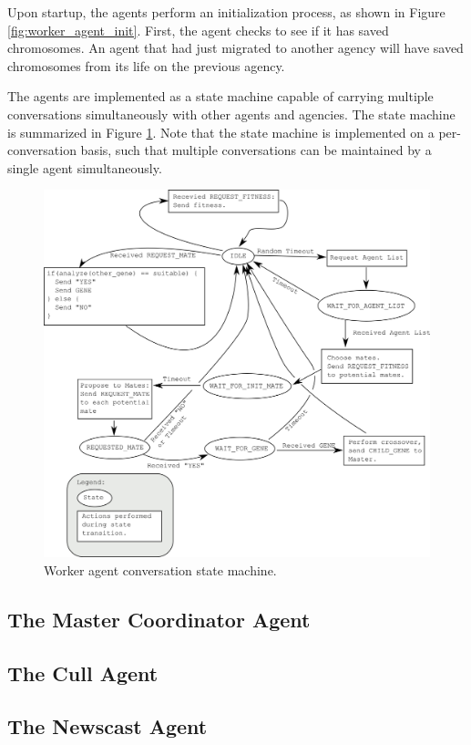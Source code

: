       Upon startup, the agents perform an initialization process, as shown
      in Figure \ref{fig:worker_agent_init}.
      First, the agent checks to see if it has saved chromosomes. 
      An agent that had just migrated to another agency will have saved
        chromosomes from its life on the previous agency. 

    The agents are implemented as a state machine capable of carrying multiple
      conversations simultaneously with other agents and agencies. 
    The state machine is summarized in Figure \ref{fig:gaAgentStateMachine}.
    Note that the state machine is implemented on a per-conversation basis, such that
      multiple conversations can be maintained by a single agent simultaneously. 

      \begin{figure}[!ht]
      \begin{center}
         \includegraphics[width=5in]{figures/convo_state_diagram}
      \end{center}
      \caption{\label{fig:gaAgentStateMachine}Worker agent conversation state machine.}
      \end{figure}
    

    \subsection{The Master Coordinator Agent}

    \subsection{The Cull Agent}

    \subsection{The Newscast Agent}


